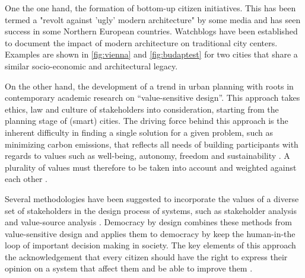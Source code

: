 \documentclass{article}
\begin{document}
\begin{multicols}{2}
One the one hand, the formation of bottom-up citizen initiatives. This has been termed a "revolt against 'ugly' modern architecture" by some media \cite{gersten_scandinavian_2023} and has seen success in some Northern European countries. Watchblogs have been established to document the impact of modern architecture on traditional city centers. Examples are shown in \cref{fig:vienna} and \cref{fig:budaptest} for two cities that share a similar socio-economic and architectural legacy.

On the other hand, the development of a trend in urban planning with roots in contemporary academic research on “value-sensitive design”. This approach takes ethics, law and culture of stakeholders into consideration, starting from the planning stage of (smart) cities. The driving force behind this approach is the inherent difficulty in finding a single solution for a given problem, such as minimizing carbon emissions, that reflects all needs of building participants with regards to values such as well-being, autonomy, freedom and sustainability \cite{helbing_ethics_2021}. A plurality of values must therefore to be taken into account and weighted against each other \cite{stiglitz_gdp_2020}.

Several methodologies have been suggested to incorporate the values of a diverse set of stakeholders in the design process of systems, such as stakeholder analysis \cite{friedman_value_2019} and value-source analysis \cite{friedman_value_2019}.
Democracy by design \cite{helbing_ethics_2021}\cite{helbing_democracy_2023} combines these methods from value-sensitive design and applies them to democracy by keep the human-in-the loop of important decision making in society. The key elements of this approach the acknowledgement that every citizen should have the right to express their opinion on a system that affect them and be able to improve them \cite{helbing_ethics_2021}.
\end{multicols}
\vspace{-5mm}
\end{document}
